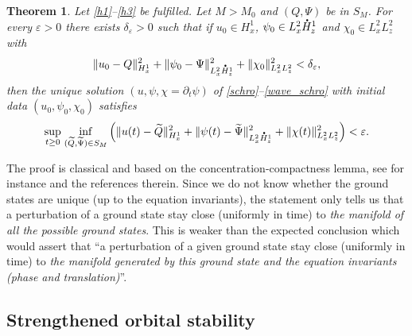 \documentclass[JEP,XML,SOM,NoEqCountersInSection,NoFloatCountersInSection,Unicode,published]{cedram}
\newtheorem{theo}[lemma]{Theorem}
\theoremstyle{definition}
\newcommand*{\overbigdot}[1]{%
\accentset{\mbox{\large\bfseries .}}{#1}}
\begin{document}
\begin{theo}\label{orbital_stab_1}
Let \eqref{h1}--\eqref{h3} be fulfilled. Let $M>M_{0}$ and $(Q,\Psi)$ be in $S_{M}$. For every $\varepsilon>0$ there exists $\delta_{\varepsilon}>0$ such that if $u_{0}\in H_{x}^{1}$, $\psi_{0}\in L_{x}^{2}\overbigdot{H}_{z}^{1}$ and $\chi_{0}\in L_{x}^{2}L_{z}^{2}$ with
\[
\|u_{0}-Q\|_{H_{x}^{1}}^{2}+\|\psi_{0}-\Psi\|_{L_{x}^{2}\overbigdot{H}_{z}^{1}}^{2}+\|\chi_{0}\|_{L_{x}^{2}L_{z}^{2}}^{2}<\delta_{\varepsilon},
\]
then the unique solution $(u,\psi,\chi=\partial_t\psi)$ of \eqref{schro}--\eqref{wave_schro} with initial data $(u_{0},\psi_{0},\chi_{0})$ satisfies
\[
\underset{t\geq 0}{\sup}\;\underset{(\widetilde{Q},\widetilde{\Psi})\in S_{M}}{\inf}\left(\|u(t)-\widetilde{Q}\|_{H_{x}^{1}}^{2}+\|\psi(t)-\widetilde{\Psi}\|_{L_{x}^{2}\overbigdot{H}_{z}^{1}}^{2}+\|\chi(t)\|_{L_{x}^{2}L_{z}^{2}}^{2}\right)<\varepsilon.
\]
\end{theo}
The proof is classical and based on the concentration-compactness lemma, see for instance \cite{Cazenave_Lions_orbital_stab, PLLcc1, PLLcc2} and the references therein.
Since we do not know whether the ground states are unique (up to the equation invariants),
the statement
only tells us that a perturbation of a ground state stay close (uniformly in time) to \emph{the manifold of all the possible ground states}.
This is weaker than the
expected conclusion which would assert that ``a perturbation of a given ground state stay close (uniformly in time) to \emph{the manifold generated by this ground state and the equation invariants (phase and translation)}''.

\subsection{Strengthened orbital stability}
\end{document}
